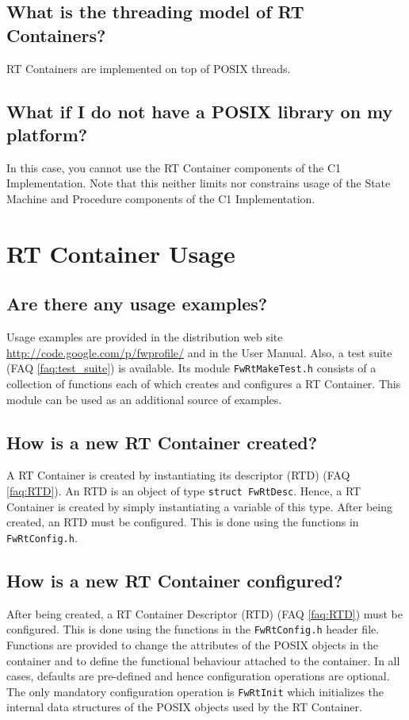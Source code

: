 \documentclass[a4paper,10pt]{article}
\let\stdsection\section
\renewcommand\section{\newpage\stdsection}
\begin{document}
\subsection{What is the threading model of RT Containers?}
RT Containers are implemented on top of POSIX threads.

\subsection{What if I do not have a POSIX library on my platform?}
In this case, you cannot use the RT Container components of the C1 Implementation. Note that this neither limits nor constrains usage of the State Machine and Procedure components of the C1 Implementation.


\section{RT Container Usage}

\subsection{Are there any usage examples?}
Usage examples are provided in the distribution web site 
\url{http://code.google.com/p/fwprofile/} and in the User Manual. Also, a test suite (FAQ \ref{faq:test_suite}) is available. Its module \texttt{FwRtMakeTest.h} consists of a collection of functions each 
of which creates and configures a RT Container. This module can be used as an additional source of examples.

\subsection{How is a new RT Container created?}
A RT Container is created by instantiating its descriptor (RTD) (FAQ \ref{faq:RTD}). An RTD is an object of type \texttt{struct FwRtDesc}. Hence, a RT Container is created by simply instantiating a variable of this type. After being created, an RTD must be configured. This is done using the functions in \texttt{FwRtConfig.h}. 

\subsection{How is a new RT Container configured?}
After being created, a RT Container Descriptor (RTD) (FAQ \ref{faq:RTD}) must be configured. This is done using the functions in the \texttt{FwRtConfig.h} header file. Functions are provided to change the attributes of the POSIX objects in the container and to define the functional behaviour attached to the container. In all cases, defaults are pre-defined and hence configuration operations are optional. The only mandatory configuration operation is \texttt{FwRtInit} which initializes the internal data structures of the POSIX objects used by the RT Container.
\end{document}
